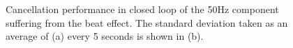 \begin{figure}[h!]
  \centering %
  \qquad
  \caption{\label{fig:beateffect} Cancellation performance in closed loop of the 50Hz component suffering from the beat effect. The standard deviation taken as an average of (a) every 5 seconds is shown in (b).}
\end{figure}

